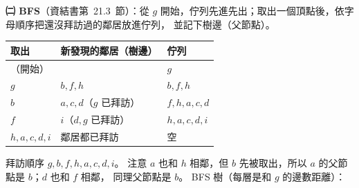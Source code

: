 \begin{pastsoln}
\textbf{㈡ BFS}（資結書第~21.3~節）：從 $g$ 開始，佇列先進先出；取出一個頂點後，依字母順序把還沒拜訪過的鄰居放進佇列，
並記下樹邊（父節點）。
\begin{center}
\begin{tabular}{lll}
\toprule
取出 & 新發現的鄰居（樹邊） & 佇列 \\
\midrule
（開始） & & $g$ \\
$g$ & $b, f, h$ & $b, f, h$ \\
$b$ & $a, c, d$（$g$ 已拜訪） & $f, h, a, c, d$ \\
$f$ & $i$（$d, g$ 已拜訪） & $h, a, c, d, i$ \\
$h, a, c, d, i$ & 鄰居都已拜訪 & 空 \\
\bottomrule
\end{tabular}
\end{center}
拜訪順序 $g, b, f, h, a, c, d, i$。 注意 $a$ 也和 $h$ 相鄰，但 $b$ 先被取出，所以 $a$ 的父節點是 $b$；$d$ 也和 $f$ 相鄰，
同理父節點是 $b$。 BFS 樹（每層是和 $g$ 的邊數距離）：
\begin{center}
\end{center}


\end{pastsoln}
